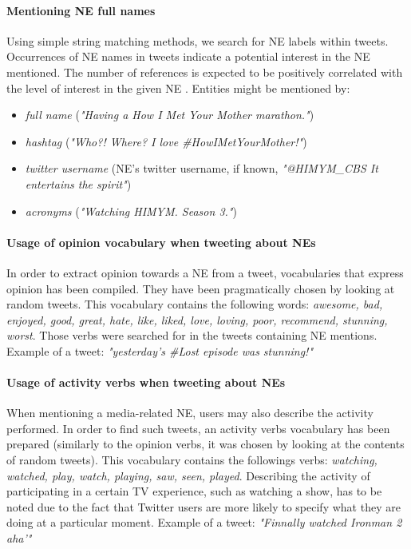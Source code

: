 \paragraph{Mentioning NE full names}
Using simple string matching methods, we search for NE labels within tweets.
Occurrences of NE names in tweets indicate a potential interest in the NE mentioned. The
number of references is expected to be positively correlated with the level of interest in the given NE \cite{twitter-content-is-it}.
Entities might be mentioned by:
\begin{itemize}
  \item \textit{full name} (\eg \textit{"Having a How I Met Your Mother marathon."})
  \item \textit{hashtag} (\eg \textit{"Who?! Where? I love \#HowIMetYourMother!"})
  \item \textit{twitter username} (NE's twitter username, if known, \eg \textit{"@HIMYM\_CBS It entertains the spirit"})
  \item \textit{acronyms} (\eg \textit{"Watching HIMYM. Season 3."})
\end{itemize}
\paragraph{Usage of opinion vocabulary when tweeting about NEs}
In order to extract opinion towards a NE from a tweet, vocabularies that express
opinion has been compiled. They have been pragmatically chosen by looking at random tweets.
This vocabulary contains the following words: \textit{awesome, bad, enjoyed, good, great, hate,
like, liked, love, loving, poor, recommend, stunning, worst}.
Those verbs were searched for in the tweets containing NE mentions.
Example of a tweet: \textit{"yesterday's \#Lost episode was stunning!"}
\paragraph{Usage of activity verbs when tweeting about NEs}
When mentioning a media-related NE, users may also describe the activity performed.
In order to find such tweets, an activity verbs vocabulary has been prepared (similarly to
the opinion verbs, it was chosen by looking at the contents of random tweets).
This vocabulary contains the followings verbs: \textit{watching, watched, play,
watch, playing, saw, seen, played}.
Describing the activity of participating in a certain TV experience, such
as watching a show, has to be noted due to the fact that Twitter users are more
likely to specify what they are doing at a particular moment.
Example of a tweet: \textit{"Finnally watched Ironman 2 aha'"}

